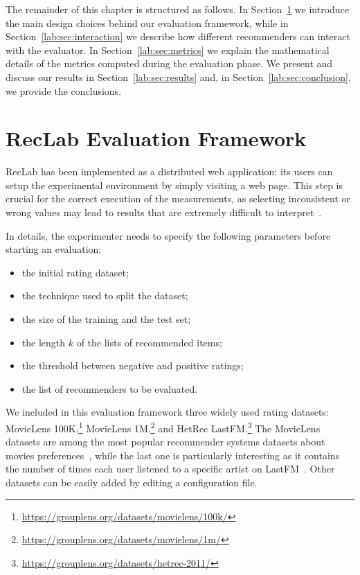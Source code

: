 The remainder of this chapter is structured as follows. In Section~\ref{lab:sec:framework} we introduce the main design choices behind our evaluation framework, while in Section~\ref{lab:sec:interaction} we describe how different recommenders can interact with the evaluator. In Section~\ref{lab:sec:metrics} we explain the mathematical details of the metrics computed during the evaluation phase. We present and discuss our results in Section~\ref{lab:sec:results} and, in Section~\ref{lab:sec:conclusion}, we provide the conclusions.

\section{RecLab Evaluation Framework}
\label{lab:sec:framework}

RecLab has been implemented as a distributed web application: its users can setup the experimental environment by simply visiting a web page. This step is crucial for the correct execution of the measurements, as selecting inconsistent or wrong values may lead to results that are extremely difficult to interpret~\cite{Jannach2015}.

In details, the experimenter needs to specify the following parameters before starting an evaluation:

\begin{itemize}
\item the initial rating dataset;
\item the technique used to split the dataset;
\item the size of the training and the test set;
\item the length $k$ of the lists of recommended items;
\item the threshold between negative and positive ratings;
\item the list of recommenders to be evaluated.
\end{itemize}

We included in this evaluation framework three widely used rating datasets: MovieLens 100K,\footnote{\url{https://grouplens.org/datasets/movielens/100k/}} MovieLens 1M,\footnote{\url{https://grouplens.org/datasets/movielens/1m/}} and HetRec LastFM.\footnote{\url{https://grouplens.org/datasets/hetrec-2011/}} The MovieLens datasets are among the most popular recommender systems datasets about movies preferences~\cite{Harper2015}, while the last one is particularly interesting as it contains the number of times each user listened to a specific artist on LastFM~\cite{Cantador2011}. Other datasets can be easily added by editing a configuration file.


